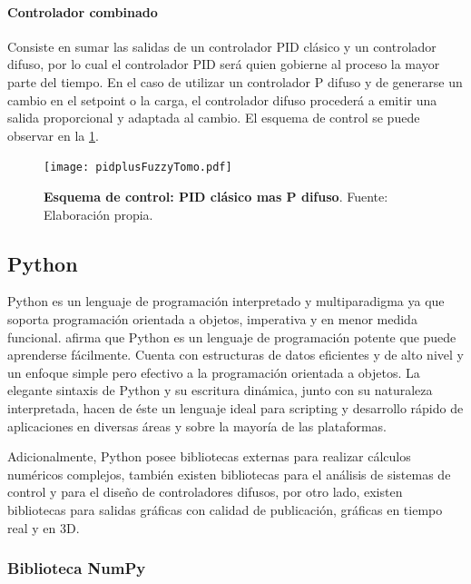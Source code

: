             \paragraph{Controlador combinado}
                
                Consiste en sumar las salidas de un controlador PID clásico y un controlador difuso, por lo cual el controlador PID será quien gobierne al proceso la mayor parte del tiempo. En el caso de utilizar un controlador P difuso y de generarse un cambio en el setpoint o la carga, el controlador difuso procederá a emitir una salida proporcional y adaptada al cambio. El esquema de control se puede observar en la \cref{fig:pidplusFuzzyTomo}.
            
                \begin{figure}[htb]
                    \centering
                    \texttt{[image: pidplusFuzzyTomo.pdf]}
                    \caption[Esquema de control: PID clásico mas P difuso]{\textbf{Esquema de control: PID clásico mas P difuso}. Fuente: Elaboración propia.} 
                    \label{fig:pidplusFuzzyTomo}
                \end{figure}

    \subsection{Python}
        
        Python es un lenguaje de programación interpretado y multiparadigma ya que soporta programación orientada a objetos, imperativa y en menor medida funcional. \textcite{guido2017tutorial} afirma que Python es un lenguaje de programación potente que puede aprenderse fácilmente. Cuenta con estructuras de datos eficientes y de alto
        nivel y un enfoque simple pero efectivo a la programación orientada a objetos. La elegante sintaxis de Python y su escritura
        dinámica, junto con su naturaleza interpretada, hacen de éste un lenguaje ideal para scripting y desarrollo rápido de
        aplicaciones en diversas áreas y sobre la mayoría de las plataformas.
        
        Adicionalmente, Python posee bibliotecas externas para realizar cálculos numéricos complejos, también existen bibliotecas para el análisis de sistemas de control y para el diseño de controladores difusos, por otro lado, existen bibliotecas para salidas gráficas con calidad de publicación, gráficas en tiempo real y en 3D.
        
        \subsubsection{Biblioteca NumPy}

